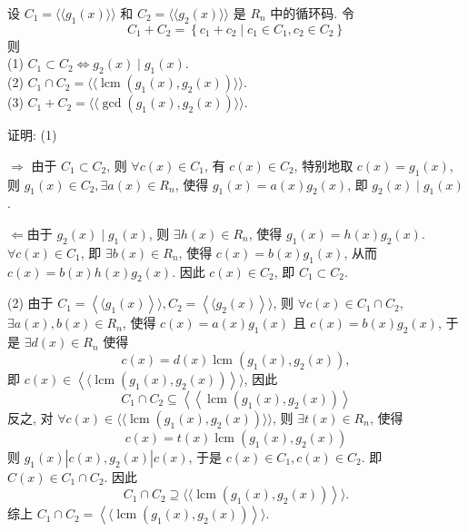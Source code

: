 \begin{exercise}
    设 $ C_{1}=\langle\langle g_{1}(x)\rangle\rangle $ 和 $ C_{2}=\langle\langle g_{2}(x)\rangle\rangle $ 是 $ R_{n} $ 中的循环码. 令
$$
C_{1}+C_{2}=\left\{c_{1}+c_{2} \mid c_{1} \in C_{1}, c_{2} \in C_{2}\right\}
$$
则\\
(1) $ C_{1} \subset C_{2} \Longleftrightarrow g_{2}(x) \mid g_{1}(x) $.\\
(2) $ C_{1} \cap C_{2}=\langle\langle \operatorname{lcm}(g_{1}(x), g_{2}(x))\rangle\rangle $.\\
(3) $ C_{1}+C_{2}=\langle\langle\operatorname{gcd}\left(g_{1}(x), g_{2}(x)\right)\rangle\rangle $.
\end{exercise}
\begin{solution}

证明: (1)

$ \Longrightarrow $ 由于 $ C_{1} \subset C_{2} $, 则 $ \forall c(x) \in C_{1} $, 有 $ c(x) \in C_{2} $, 特别地取 $ c(x)=g_{1}(x) $, 则 $ g_{1}(x) \in C_{2}, \exists a(x) \in R_{n} $, 使得 $ g_{1}(x)=a(x) g_{2}(x) $, 即 $ g_{2}(x) \mid g_{1}(x) $.

 $ \Longleftarrow $由于 $ g_{2}(x) \mid g_{1}(x) $, 则 $ \exists h(x) \in R_{n} $, 使得 $ g_{1}(x)=h(x) g_{2}(x) $.
$ \forall c(x) \in C_{1} $, 即 $ \exists b(x) \in R_{n} $, 使得 $ c(x)=b(x) g_{1}(x) $,
从而 $ c(x)=b(x) h(x) g_{2}(x) $. 因此 $ c(x) \in C_{2} $, 即 $ C_{1} \subset C_{2} $.

(2) 由于 $ C_{1}=\left\langle\langle g_{1}(x)\right\rangle\rangle, C_{2}=\left\langle\langle g_{2}(x)\right\rangle\rangle $, 则 $ \forall c(x) \in C_{1} \cap C_{2} $, $ \exists a(x), b(x) \in R_{n} $, 使得 $ c(x)=a(x) g_{1}(x) $ 且 $ c(x)=b(x) g_{2}(x) $, 于是 $ \exists d(x) \in R_{n} $ 使得
$$
c(x)=d(x) \operatorname{lcm}\left(g_{1}(x), g_{2}(x)\right),
$$
即 $ c(x) \in\left\langle\langle\operatorname{lcm}\left(g_{1}(x), g_{2}(x)\right)\right\rangle\rangle $, 因此
$$
C_{1} \cap C_{2} \subseteq\left\langle\left\langle\operatorname{lcm}\left(g_{1}(x), g_{2}(x)\right)\right\rangle\right.
$$
反之, 对 $ \forall c(x) \in \langle\langle\operatorname{lcm}\left(g_{1}(x), g_{2}(x)\right)\rangle \rangle$, 则 $ \exists t(x) \in R_{n} $, 使得
$$
c(x)=t(x) \operatorname{lcm}\left(g_{1}(x), g_{2}(x)\right)
$$
则 $ g_{1}(x)\left|c(x), g_{2}(x)\right| c(x) $, 于是 $ c(x) \in C_{1}, c(x) \in C_{2} $.
即 $ C(x) \in C_{1} \cap C_{2} $. 因此
$$
\left.C_{1} \cap C_{2} \supseteq \langle\langle\operatorname{lcm}\left(g_{1}(x), g_{2}(x)\right)\right\rangle \rangle.
$$
综上 $ C_{1} \cap C_{2}=\left\langle\langle\operatorname{lcm}\left(g_{1}(x), g_{2}(x)\right)\right\rangle \rangle$.


\end{solution}
